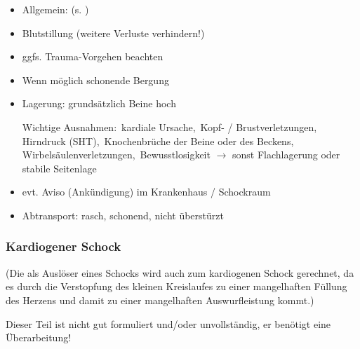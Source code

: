 {

\begin{itemize}
  \item Allgemein:  (s.
  )
  \item Blutstillung  (weitere Verluste verhindern!)
  \item ggfs. Trauma-Vorgehen beachten
  \item Wenn möglich schonende Bergung
  \item Lagerung: grundsätzlich Beine hoch
  
  Wichtige Ausnahmen: {\textperiodcentered}\,kardiale Ursache,
  {\textperiodcentered}\,Kopf- / Brust\-ver\-letzungen,
  {\textperiodcentered}\,Hirndruck (SHT),
  {\textperiodcentered}\,Knochenbrüche der Beine oder des
  Beckens,
  {\textperiodcentered}\,Wirbelsäulenverletzungen,
  {\textperiodcentered}\,Bewusstlosigkeit ${\rightarrow}$ sonst Flachlagerung oder stabile Seitenlage 
  \item evt. Aviso (Ankündigung) im  Krankenhaus / Schockraum
  \item Abtransport: rasch, schonend, nicht überstürzt
\end{itemize}
}



\subsubsection{Kardiogener Schock}
\label{topic:schock-kardiogener}

(Die  als Auslöser eines Schocks wird
auch zum kardiogenen Schock gerechnet, da es durch die
Verstopfung des kleinen Kreislaufes zu einer mangelhaften
Füllung des Herzens und damit zu einer mangelhaften
Auswurfleistung kommt.)

{Dieser Teil ist nicht gut formuliert und/oder unvollständig, 
er benötigt eine Überarbeitung!}

